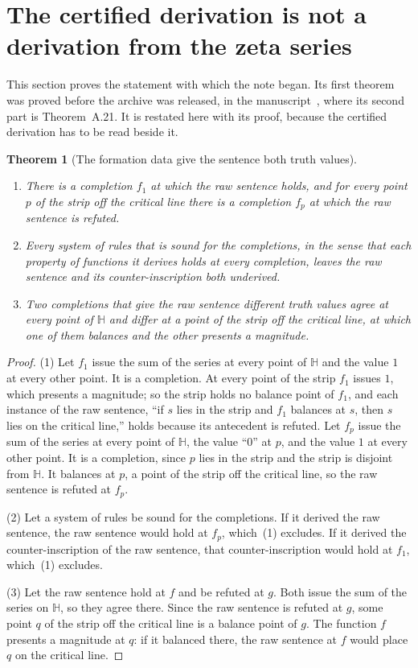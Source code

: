 \documentclass[11pt]{article}
\newtheorem{theorem}{Theorem}[section]
\theoremstyle{definition}
\theoremstyle{remark}
\newcommand{\Hp}{\mathbb H}
\begin{document}
\section{The certified derivation is not a derivation from the zeta series}\label{sec:between}

This section proves the statement with which the note began. Its first theorem was proved before the archive was released, in the manuscript~\citep{tv}, where its second part is Theorem~A.21. It is restated here with its proof, because the certified derivation has to be read beside it.

\begin{theorem}[The formation data give the sentence both truth values]\label{thm:both}
\leavevmode
\begin{enumerate}[leftmargin=2em,itemsep=1pt]
\item There is a completion $f_1$ at which the raw sentence holds, and for every point $p$ of the strip off the critical line there is a completion $f_p$ at which the raw sentence is refuted.
\item Every system of rules that is sound for the completions, in the sense that each property of functions it derives holds at every completion, leaves the raw sentence and its counter-inscription both underived.
\item Two completions that give the raw sentence different truth values agree at every point of $\Hp$ and differ at a point of the strip off the critical line, at which one of them balances and the other presents a magnitude.
\end{enumerate}
\end{theorem}

\begin{proof}
(1) Let $f_1$ issue the sum of the series at every point of $\Hp$ and the value $1$ at every other point. It is a completion. At every point of the strip $f_1$ issues $1$, which presents a magnitude; so the strip holds no balance point of $f_1$, and each instance of the raw sentence, ``if $s$ lies in the strip and $f_1$ balances at $s$, then $s$ lies on the critical line,'' holds because its antecedent is refuted. Let $f_p$ issue the sum of the series at every point of $\Hp$, the value ``0'' at $p$, and the value $1$ at every other point. It is a completion, since $p$ lies in the strip and the strip is disjoint from $\Hp$. It balances at $p$, a point of the strip off the critical line, so the raw sentence is refuted at $f_p$.

(2) Let a system of rules be sound for the completions. If it derived the raw sentence, the raw sentence would hold at $f_p$, which~(1) excludes. If it derived the counter-inscription of the raw sentence, that counter-inscription would hold at $f_1$, which~(1) excludes.

(3) Let the raw sentence hold at $f$ and be refuted at $g$. Both issue the sum of the series on $\Hp$, so they agree there. Since the raw sentence is refuted at $g$, some point $q$ of the strip off the critical line is a balance point of $g$. The function $f$ presents a magnitude at $q$: if it balanced there, the raw sentence at $f$ would place $q$ on the critical line.
\end{proof}
\end{document}

